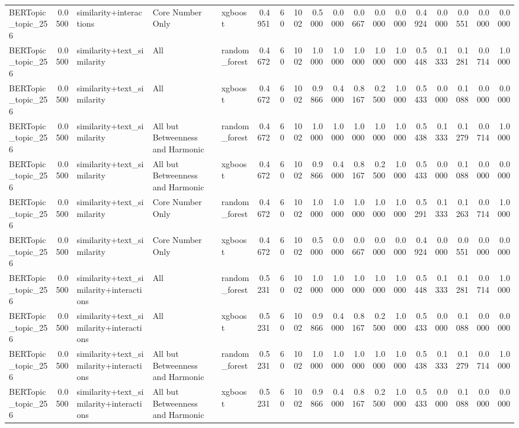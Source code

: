\begin{tabular}{lrlllrrrrrrrrrrrrr}
BERTopic_topic_256 & 0.0500 & similarity+interactions & Core Number Only & xgboost & 0.4951 & 60 & 1002 & 0.5000 & 0.0000 & 0.0667 & 0.0000 & 0.0000 & 0.4924 & 0.0000 & 0.0551 & 0.0000 & 0.0000 \\
BERTopic_topic_256 & 0.0500 & similarity+text_similarity & All & random_forest & 0.4672 & 60 & 1002 & 1.0000 & 1.0000 & 1.0000 & 1.0000 & 1.0000 & 0.5448 & 0.1333 & 0.1281 & 0.0714 & 1.0000 \\
BERTopic_topic_256 & 0.0500 & similarity+text_similarity & All & xgboost & 0.4672 & 60 & 1002 & 0.9866 & 0.4000 & 0.8167 & 0.2500 & 1.0000 & 0.5433 & 0.0000 & 0.1088 & 0.0000 & 0.0000 \\
BERTopic_topic_256 & 0.0500 & similarity+text_similarity & All but Betweenness and Harmonic & random_forest & 0.4672 & 60 & 1002 & 1.0000 & 1.0000 & 1.0000 & 1.0000 & 1.0000 & 0.5438 & 0.1333 & 0.1279 & 0.0714 & 1.0000 \\
BERTopic_topic_256 & 0.0500 & similarity+text_similarity & All but Betweenness and Harmonic & xgboost & 0.4672 & 60 & 1002 & 0.9866 & 0.4000 & 0.8167 & 0.2500 & 1.0000 & 0.5433 & 0.0000 & 0.1088 & 0.0000 & 0.0000 \\
BERTopic_topic_256 & 0.0500 & similarity+text_similarity & Core Number Only & random_forest & 0.4672 & 60 & 1002 & 1.0000 & 1.0000 & 1.0000 & 1.0000 & 1.0000 & 0.5291 & 0.1333 & 0.1263 & 0.0714 & 1.0000 \\
BERTopic_topic_256 & 0.0500 & similarity+text_similarity & Core Number Only & xgboost & 0.4672 & 60 & 1002 & 0.5000 & 0.0000 & 0.0667 & 0.0000 & 0.0000 & 0.4924 & 0.0000 & 0.0551 & 0.0000 & 0.0000 \\
BERTopic_topic_256 & 0.0500 & similarity+text_similarity+interactions & All & random_forest & 0.5231 & 60 & 1002 & 1.0000 & 1.0000 & 1.0000 & 1.0000 & 1.0000 & 0.5448 & 0.1333 & 0.1281 & 0.0714 & 1.0000 \\
BERTopic_topic_256 & 0.0500 & similarity+text_similarity+interactions & All & xgboost & 0.5231 & 60 & 1002 & 0.9866 & 0.4000 & 0.8167 & 0.2500 & 1.0000 & 0.5433 & 0.0000 & 0.1088 & 0.0000 & 0.0000 \\
BERTopic_topic_256 & 0.0500 & similarity+text_similarity+interactions & All but Betweenness and Harmonic & random_forest & 0.5231 & 60 & 1002 & 1.0000 & 1.0000 & 1.0000 & 1.0000 & 1.0000 & 0.5438 & 0.1333 & 0.1279 & 0.0714 & 1.0000 \\
BERTopic_topic_256 & 0.0500 & similarity+text_similarity+interactions & All but Betweenness and Harmonic & xgboost & 0.5231 & 60 & 1002 & 0.9866 & 0.4000 & 0.8167 & 0.2500 & 1.0000 & 0.5433 & 0.0000 & 0.1088 & 0.0000 & 0.0000 \\

\end{tabular}
